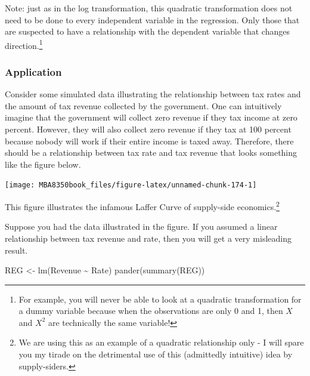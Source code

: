 \documentclass[
]{book}
\newenvironment{Shaded}{\begin{snugshade}}{\end{snugshade}}
\newcommand{\FunctionTok}[1]{\textcolor[rgb]{0.00,0.00,0.00}{#1}}
\newcommand{\NormalTok}[1]{#1}
\newcommand{\OtherTok}[1]{\textcolor[rgb]{0.56,0.35,0.01}{#1}}
\newcommand{\SpecialCharTok}[1]{\textcolor[rgb]{0.00,0.00,0.00}{#1}}
\begin{document}
Note: just as in the log transformation, this quadratic transformation does not need to be done to every independent variable in the regression. Only those that are suspected to have a relationship with the dependent variable that changes direction.\footnote{For example, you will never be able to look at a quadratic transformation for a dummy variable because when the observations are only 0 and 1, then \(X\) and \(X^2\) are technically the same variable!}

\hypertarget{application-6}{%
\subsubsection*{Application}\label{application-6}}

Consider some simulated data illustrating the relationship between tax rates and the amount of tax revenue collected by the government. One can intuitively imagine that the government will collect zero revenue if they tax income at zero percent. However, they will also collect zero revenue if they tax at 100 percent because nobody will work if their entire income is taxed away. Therefore, there should be a relationship between tax rate and tax revenue that looks something like the figure below.

\begin{center}\texttt{[image: MBA8350book\_files/figure-latex/unnamed-chunk-174-1]} \end{center}

This figure illustrates the infamous Laffer Curve of supply-side economics.\footnote{We are using this as an example of a quadratic relationship only - I will spare you my tirade on the detrimental use of this (admittedly intuitive) idea by supply-siders.}

Suppose you had the data illustrated in the figure. If you assumed a linear relationship between tax revenue and rate, then you will get a very misleading result.

\begin{Shaded}
\begin{Highlighting}[]
\NormalTok{REG }\OtherTok{\textless{}{-}} \FunctionTok{lm}\NormalTok{(Revenue }\SpecialCharTok{\textasciitilde{}}\NormalTok{ Rate)}
\FunctionTok{pander}\NormalTok{(}\FunctionTok{summary}\NormalTok{(REG))}
\end{Highlighting}
\end{Shaded}
\end{document}
